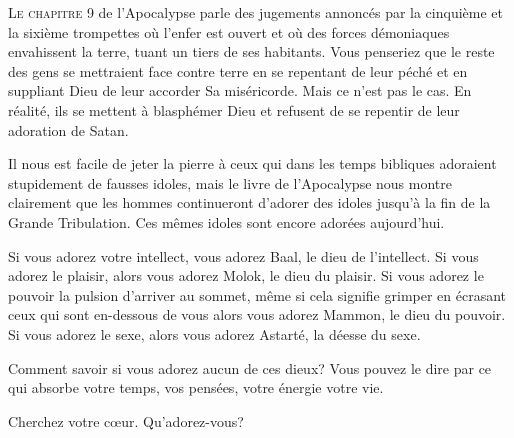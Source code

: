 


\lettrine{L}{e chapitre 9} de l'Apocalypse parle des jugements
 annoncés par la cinquième et la sixième trompettes où l'enfer est ouvert
 et où des forces démoniaques envahissent la terre,
 tuant un tiers de ses habitants.
 Vous penseriez que le reste des gens se mettraient face contre terre
 en se repentant de leur péché et en suppliant Dieu de leur accorder
 Sa miséricorde. Mais ce n'est pas le cas.
 En réalité, ils se mettent à blasphémer Dieu et refusent
 de se repentir de leur adoration de Satan.


Il nous est facile de jeter la pierre à ceux qui dans les temps bibliques
 adoraient stupidement de fausses idoles, mais le livre de l'Apocalypse
 nous montre clairement que les hommes continueront d'adorer des idoles
 jusqu'à la fin de la Grande Tribulation.
 Ces mêmes idoles sont encore adorées aujourd'hui.

Si vous adorez votre intellect, vous adorez Baal, le dieu de l'intellect.
 Si vous adorez le plaisir, alors vous adorez Molok, le dieu du plaisir.
 Si vous adorez le pouvoir \ocadr la pulsion d'arriver au sommet,
 même si cela signifie grimper en écrasant ceux qui sont en-dessous
 de vous \fcadr{} alors vous adorez Mammon, 
 le dieu du pouvoir. Si vous adorez le sexe, alors vous adorez Astarté,
 la déesse du sexe.

Comment savoir si vous adorez aucun 
 de ces dieux?
 Vous pouvez le dire par ce qui absorbe votre temps,
 vos pensées, votre énergie \ocadr votre vie.

Cherchez 
 votre c\oe{}ur. Qu'adorez-vous?

\dvrule



